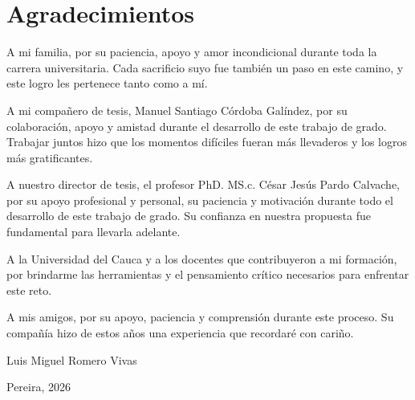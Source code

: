 \chapter*{Agradecimientos}
\vspace{1em}
\setlength{\parindent}{0pt}

A mi familia, por su paciencia, apoyo y amor incondicional durante toda la carrera universitaria. Cada sacrificio suyo fue también un paso en este camino, y este logro les pertenece tanto como a mí.

\vspace{1em}
A mi compañero de tesis, Manuel Santiago Córdoba Galíndez, por su colaboración, apoyo y amistad durante el desarrollo de este trabajo de grado. Trabajar juntos hizo que los momentos difíciles fueran más llevaderos y los logros más gratificantes.

\vspace{1em}
A nuestro director de tesis, el profesor PhD. MS.c. César Jesús Pardo Calvache, por su apoyo profesional y personal, su paciencia y motivación durante todo el desarrollo de este trabajo de grado. Su confianza en nuestra propuesta fue fundamental para llevarla adelante.

\vspace{1em}
A la Universidad del Cauca y a los docentes que contribuyeron a mi formación, por brindarme las herramientas y el pensamiento crítico necesarios para enfrentar este reto.

\vspace{1em}
A mis amigos, por su apoyo, paciencia y comprensión durante este proceso. Su compañía hizo de estos años una experiencia que recordaré con cariño.

\vspace{1em}

\begin{flushright}
    Luis Miguel Romero Vivas

    Pereira, 2026
\end{flushright}